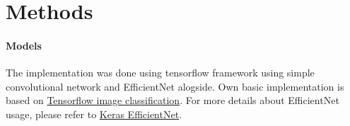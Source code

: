 \section{Methods}

\paragraph{Models}
The implementation was done using tensorflow framework using simple convolutional network and EfficientNet alogside.
Own basic implementation is based on \href{https://www.tensorflow.org/tutorials/images/classification}{Tensorflow image classification}.
For more details about EfficientNet usage, please refer to \href{https://keras.io/api/applications/efficientnet/}{Keras EfficientNet}.



